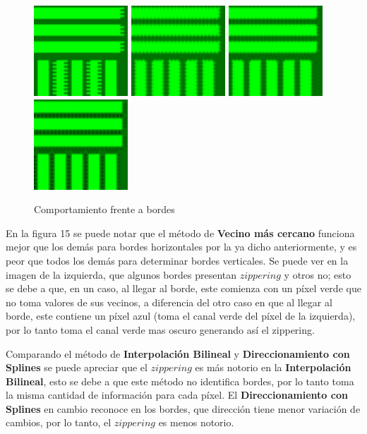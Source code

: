 \documentclass[a4paper]{article}
\begin{document}
\begin{figure}[h!]
\centering
\includegraphics[width=100pt]{img/Bordes1.png}
\includegraphics[width=100pt]{img/Bordes2.png}
\includegraphics[width=100pt]{img/Bordes3.png}
\includegraphics[width=100pt]{img/Bordes4.png}
\caption{Comportamiento frente a bordes}
\end{figure}

En la figura 15 se puede notar que el método de \textbf{Vecino más cercano} funciona mejor que los demás para bordes horizontales por la ya dicho anteriormente, y es peor que todos los demás para determinar bordes verticales. Se puede ver en la imagen de la izquierda, que algunos bordes presentan $zippering$ y otros no; esto se debe a que, en un caso, al llegar al borde, este comienza con un píxel verde que no toma valores de sus vecinos, a diferencia del otro caso en que al llegar al borde, este contiene un píxel azul (toma el canal verde del píxel de la izquierda), por lo tanto toma el canal verde mas oscuro generando así el zippering.

Comparando el método de \textbf{Interpolación Bilineal} y \textbf{Direccionamiento con Splines} se puede apreciar que el $zippering$ es más notorio en la  \textbf{Interpolación Bilineal}, esto se debe a que este método no identifica bordes, por lo tanto toma la misma cantidad de información para cada píxel. El \textbf{Direccionamiento con Splines} en cambio reconoce en los bordes, que dirección tiene menor variación de cambios, por lo tanto, el $zippering$ es menos notorio.
\end{document}
